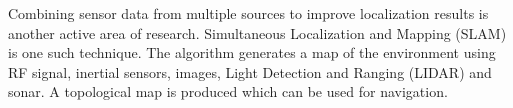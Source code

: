 Combining sensor data from multiple sources to improve localization results is another active area of research. Simultaneous Localization and Mapping (SLAM) is one such technique. The algorithm generates a map of the environment using RF signal, inertial sensors, images, Light Detection and Ranging (LIDAR) and sonar. A topological map is produced which can be used for navigation.


%





